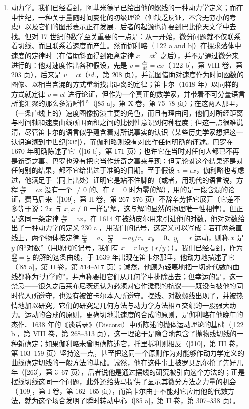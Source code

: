 \begin{enumerate}
世纪，就必须认识到：直到牛顿和莱布尼茨背过身去抛开过去、承认必须暂时不在严格的证明中、而是在结果的多产与融贯中为他们新方法寻求证成之前，现代分析的道路是不会打通的。
\item
  动力学。我们已经看到，阿基米德早已给出他的螺线的一种动力学定义；而在中世纪，一种关于量随时间变化的初级理论（但缺乏反证，不含无穷小的考虑）以及它们的图形表示正在发展，后者的起源也许要到巴比伦天文学中去找。但对 17 世纪的数学至关重要的一点是：从一开始，微分问题就不仅联系着切线、而且联系着速度而产生。然而伽利略（{[}122 a and b{]}）在探求落体中速度的定律时（在借助斜面得到距离定律 \(x = at^2\) 之后），并不是通过微分来进行的：他对速度作出各种假设，先是 \(v = \frac{dx}{dt} = cx\)（{[}122 b{]}，第 VIII 卷，第 203 页），后来是 \(v = ct\)（\(id.\)，第 208 页），并试图借助对速度作为时间函数的图像、以相当含混的方式重新找出距离的定律；笛卡尔（1618 年）以同样的方式就定律 \(v = ct\) 进行论证，但作为一个真正的数学家，并带着不可分量语言所能汇聚的那么多清晰性\(^{5}\)（{[}85 a{]}，第 X 卷，第 75–78 页）；在这两人那里，（一条直线上的）速度图像扮演主要的角色，而且有理由问，他们对所经距离与时间轴和速度曲线所围面积之间的比例性意识到何种程度；但这一点很难说清，尽管笛卡尔的语言似乎蕴含着对所说事实的认识（某些历史学家想把这一认识追溯到中世纪{[}335{]}），而伽利略则没有对此作任何明确的评述。巴罗在 1670 年明确陈述了它（{[}16 b{]}，第 171 页）；也许它在当时对任何人都已不再是新奇之事，巴罗也没有把它当作新奇之事来呈现；但无论对这个结果还是对任何别的结果，都不宜给出过于准确的日期。至于假设 \(v = cx\)，伽利略也考虑过，他满足于（同上出处）证明它是站不住脚的（或者，用现代的语言说，方程 \(\frac{dx}{dt} = cx\) 没有一个 \(\neq 0\) 的、在 \(t = 0\) 时为零的解），用的是一段含混的论证，费马后来（{[}109{]}，第 II 卷，第 267–276 页）不辞辛劳把它展开（它差不多等于说：\(2x\) 与 \(x, x \neq 0\) 一样是解，这与解的显然的物理唯一性相悖）。但正是这同一条定律 \(\frac{dx}{dt} = cx\)，在 1614 年被纳皮尔用来引进他的对数，他对对数给出了一种动力学的定义{[}230 a{]}，用我们的记号，这定义可以写成：若在两条直线上，两个物体按定律 \(\frac{dx}{dt} = a\)、\(\frac{dy}{dt} = -ay/r\)、\(x_0 = 0\)、\(y_0 = r\) 运动，则称 \(x\) 是 \(y\) 的“对数”（用现代的记号，我们有 \(x = r \log(r/y)\)）。我们已经看到，作为 \(\frac{dy}{dx} = \frac{c}{x}\) 的解的这条曲线，于 1639 年出现在笛卡尔那里，他动力地描述了它（{[}85 a{]}，第 II 卷，第 514–517 页）；诚然，他颇为轻蔑地把一切非代数的曲线都称为“力学的”，并声称要把它们从几何学中排除出去；但幸运的是，这一禁忌——很久之后莱布尼茨还认为必须对它作激烈的抗议——既没有被他的同时代人所遵守，也没有被笛卡尔本人所遵守。摆线、对数螺线出现了，并被热情地加以研究，它们的研究是几何方法与动力学方法相互交织的一股强大助力。运动的合成的原则，更确切地说速度的合成的原则，是伽利略在他晚年的杰作、1638 年的《谈话录》（Discorsi）中所陈述的抛体运动理论的基础（{[}122 b{]}，第 VIII 卷，第 268–313 页），这一理论于是隐含地包含了抛物线切线的一种新确定；如果伽利略未曾明确陈述它，托里拆利则相反（{[}310{]}，第 III 卷，第 103–159 页）坚持这一点，甚至把这同一个原则作为对能够作动力学定义的曲线确定切线的一般方法的基础。诚然，他在这件事上被罗贝瓦尔抢了先好几年（{[}263{]}，第 3–67 页），后者说他是通过摆线的研究被引向这个方法的；正是摆线切线这同一个问题，此外还给费马提供了显示其微分方法之力量的机会（{[}109{]}，第 I 卷，第 162–165 页），而笛卡尔由于不能对它应用他的代数方法，就为这个场合发明了瞬时转动中心（{[}85 a{]}，第 II 卷，第 307–338 页）。

\end{enumerate}
